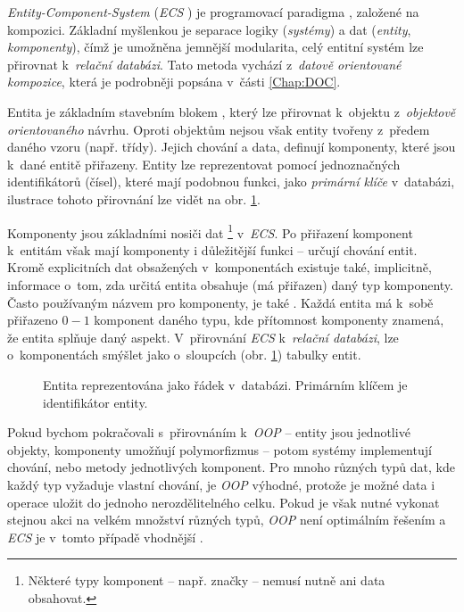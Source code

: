 \emph{Entity-Component-System} (\emph{ECS} \cite{WhatIsECS} \cite{UnderstandingECS}) je programovací paradigma \cite{EntitySystemsFuture}, založené na kompozici. Základní myšlenkou je separace logiky (\emph{systémy}) a dat (\emph{entity}, \emph{komponenty}), čímž je umožněna jemnější modularita, celý entitní systém lze přirovnat k~\emph{relační databázi}. Tato metoda vychází z~\emph{datově orientované kompozice}, která je podrobněji popsána v~části \ref{Chap:DOC}. 

Entita je základním stavebním blokem \cite{EntitySystemsFuture}, který lze přirovnat k~objektu z~\emph{objektově orientovaného} návrhu. Oproti objektům nejsou však entity tvořeny z~předem daného vzoru (např. třídy). Jejich chování a data, definují komponenty, které jsou k~dané entitě přiřazeny. Entity lze reprezentovat pomocí jednoznačných identifikátorů (čísel), které mají podobnou funkci, jako \emph{primární klíče} v~databázi, ilustrace tohoto přirovnání lze vidět na obr. \ref{Fig:ECSDB}.

Komponenty jsou základními nosiči dat \footnote{Některé typy komponent -- např. značky -- nemusí nutně ani data obsahovat.} v~\emph{ECS}. Po přiřazení komponent k~entitám však mají komponenty i důležitější funkci -- určují chování entit. Kromě explicitních dat obsažených v~komponentách existuje také, implicitně, informace o~tom, zda určitá entita obsahuje (má přiřazen) daný typ komponenty. Často používaným názvem pro komponenty, je také  \cite{EntitySystemsFuture}. Každá entita má k~sobě přiřazeno $0-1$ komponent daného typu, kde přítomnost komponenty znamená, že entita splňuje daný aspekt. V~přirovnání \emph{ECS} k~\emph{relační databázi}, lze o~komponentách smýšlet jako o~sloupcích (obr. \ref{Fig:ECSDB}) tabulky entit.

\begin{figure}
	\caption{Entita reprezentována jako řádek v~databázi. Primárním klíčem je identifikátor entity.}
	\label{Fig:ECSDB}
\end{figure}

Pokud bychom pokračovali s~přirovnáním k~\emph{OOP} -- entity jsou jednotlivé objekty, komponenty umožňují polymorfizmus -- potom systémy implementují chování, nebo metody jednotlivých komponent. Pro mnoho různých typů dat, kde každý typ vyžaduje vlastní chování, je \emph{OOP} výhodné, protože je možné data i operace uložit do jednoho nerozdělitelného celku. Pokud je však nutné vykonat stejnou akci na velkém množství různých typů, \emph{OOP} není optimálním řešením a \emph{ECS} je v~tomto případě vhodnější \cite{EntitySystemsFuture}. 

